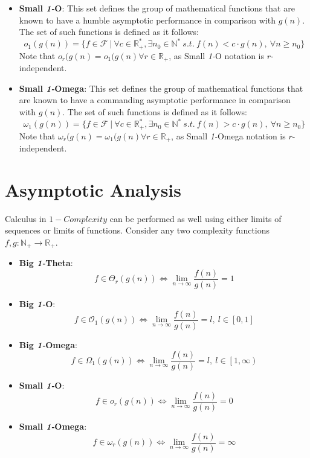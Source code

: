 \begin{itemize}
  \item \textbf{Small \textit{1-}O}:
  This set defines the group of mathematical functions that are known to have a humble
 asymptotic performance in comparison with  $g(n)$. The set of such functions is defined as it follows:
  \[o_{1}(g(n)) = \lbrace f \in \mathcal{F}\ |\ \forall c \in \mathbb{R}^{*}_{+}, \exists n_{0} \in \mathbb{N}^{*}\ s.t.\  f(n) < c \cdot g(n),\  \forall n \geq n_{0} \rbrace\]
Note that $o_{r}(g(n) = o_{1}(g(n) \forall r\in  \mathbb{R}_{+}$, as Small \textit{1-}O  notation is $r$-independent.
  
  \item \textbf{Small \textit{1-}Omega}:
  This set defines the group of mathematical functions that are known to have a commanding asymptotic performance in comparison with  $g(n)$.
  The set of such functions is defined as it follows:
  \[\omega_{1}(g(n)) = \lbrace f \in \mathcal{F}\ |\ \forall c \in \mathbb{R}^{*}_{+}, \exists n_{0} \in \mathbb{N}^{*}\ s.t.\  f(n) > c \cdot g(n),\  \forall n \geq n_{0} \rbrace\]
    Note that $\omega_{r}(g(n) = \omega_{1}(g(n) \forall r\in  \mathbb{R}_{+}$, as Small \textit{1-}Omega  notation is $r$-independent.

\end{itemize}

\section{Asymptotic Analysis}
Calculus in $1-Complexity$ can be performed as well using either limits of sequences or limits of functions. Consider any two complexity functions $f,g:\mathbb{N}_{+}\longrightarrow\mathbb{R}_{+}$.

\begin{itemize}
  \item \textbf{Big \textit{1-}Theta}: 
  \[ f \in \Theta_{r}(g(n)) \Leftrightarrow \lim_{n\to\infty} \dfrac{f(n)}{g(n)} = 1 \]

  \item \textbf{Big \textit{1-}O}: 
    \[ f \in \mathcal{O}_{1}(g(n)) \Leftrightarrow \lim_{n\to\infty} \dfrac{f(n)}{g(n)} = l,\ l \in \left[ 0, 1 \right] \]
  
  \item \textbf{Big \textit{1-}Omega}: 
      \[ f \in \Omega_{1}(g(n)) \Leftrightarrow \lim_{n\to\infty} \dfrac{f(n)}{g(n)} = l,\ l \in \left[ 1, \infty \right) \]

  \item \textbf{Small \textit{1-}O}:
    \[ f \in o_{r}(g(n)) \Leftrightarrow \lim_{n\to\infty} \dfrac{f(n)}{g(n)} = 0 \]

  \item \textbf{Small \textit{1-}Omega}:
    \[ f \in \omega_{r}(g(n)) \Leftrightarrow \lim_{n\to\infty} \dfrac{f(n)}{g(n)} = \infty \]

\end{itemize}



